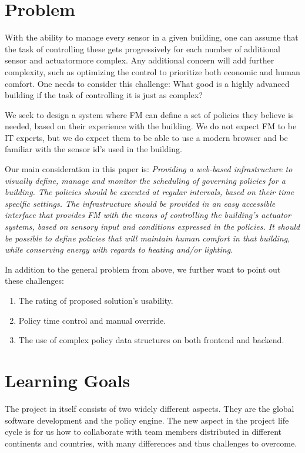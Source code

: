 \section{Problem} \label{sec:problem}
With the ability to manage every sensor in a given building, one can assume that the task of controlling these gets progressively \textemdash for each number of additional sensor and actuator\textemdash more complex. Any additional concern will add further complexity, such as optimizing the control to prioritize both economic and human comfort. One needs to consider this challenge: What good is a highly advanced building if the task of controlling it is just as complex?

We seek to design a system where FM can define a set of policies they believe is needed, based on their experience with the building. We do not expect FM to be IT experts, but we do expect them to be able to use a modern browser and be familiar with the sensor id's used in the building.

Our main consideration in this paper is: \textit{Providing a web-based infrastructure to visually define, manage and monitor the scheduling of governing policies for a building. The policies should be executed at regular intervals, based on their time specific settings. The infrastructure should be provided in an easy accessible interface that provides FM with the means of controlling the building's actuator systems, based on sensory input and conditions expressed in the policies. It should be possible to define policies that will maintain human comfort in that building, while conserving energy with regards to heating and/or lighting.}

In addition to the general problem from above, we further want to point out these challenges:
\begin{enumerate}
	\item The rating of proposed solution's usability.
	\item Policy time control and manual override.
	\item The use of complex policy data structures on both frontend and backend.
\end{enumerate}

\section{Learning Goals} \label{sec:learninggoals}
The project in itself consists of two widely different aspects. They are the global software development and the policy engine. The new aspect in the project life cycle is for us how to collaborate with team members distributed in different continents and countries, with many differences and thus challenges to overcome.


